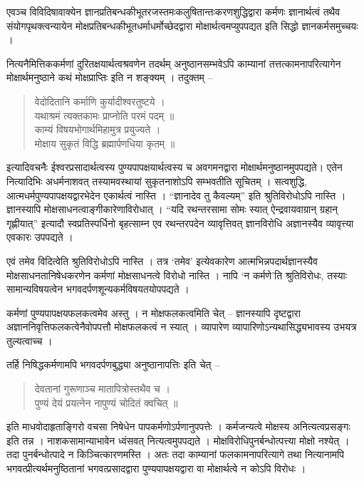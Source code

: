 एवञ्च विविदिषावाक्येन ज्ञानप्रतिबन्धकीभूतरजस्तमःकलुषितान्तःकरणशुद्धिद्वारा कर्मणः ज्ञानार्थत्वं तथैव संयोगपृथक्त्वन्यायेन मोक्षप्रतिबन्धकीभूतधर्माधर्मोच्छेदद्वारा मोक्षार्थत्वमप्युपपद्यत इति सिद्धो ज्ञानकर्मसमुच्चयः ।

नित्यनैमित्तिककर्मणां दुरितक्षयार्थत्वश्रवणेन तदर्थम् अनुष्ठानसम्भवेऽपि काम्यानां तत्तत्कामनापरित्यागेन मोक्षार्थमनुष्ठाने कथं मोक्षप्राप्तिः इति न शङ्क्यम् । तदुक्तम् –
\begin{verse}
वेदोदितानि कर्माणि कुर्यादीश्वरतुष्टये ।\\
यथाश्रमं त्यक्तकामः प्राप्नोति परमं पदम् ॥\\
काम्यं विषयभोगार्थमिहामुत्र प्रयुज्यते ।\\
मोक्षाय सुकृतं विद्धि ब्रह्मार्पणधिया कृतम् ॥
\end{verse}
इत्यादिवचनैः ईश्वरप्रसादार्थत्वस्य पुण्यपापक्षयार्थत्वस्य च अवगमनद्वारा मोक्षार्थमनुष्ठानमुपपद्यते। एतेन नित्यादिभिः अधर्मनाशवत् तस्यामवस्थायां सुकृतनाशोऽपि सम्भवतीति सूचितम् । सत्वशुद्धि, आत्मधर्मपुण्यपापक्षयद्वारभेदेन एकार्थत्वं नास्ति । “ज्ञानादेव तु कैवल्यम्” इति श्रुतिविरोधोऽपि नास्ति । ज्ञानस्यापि मोक्षसाधनत्वाङ्गीकारेणाविरोधात् । “यदि रथन्तरसामा सोमः स्यात् ऐन्द्रवायवाग्रान् ग्रहान् गृह्णीयात्” इत्यादौ स्वप्रतिस्पर्धिनो बृहत्साम्न एव रथन्तरपदेन व्यावृत्तिवत् ज्ञानविरोधि अज्ञानस्यैव व्यावृत्त्या एवकारः उपपद्यते ।

एवं तमेव विदित्वेति श्रुतिविरोधोऽपि नास्ति । तत्र ‘तमेव’ इत्येवकारेण आत्मभिन्नपदार्थज्ञानस्यैव मोक्षसाधनतानिषेधकरणेन कर्मणां मोक्षसाधनत्वे विरोधो नास्ति । नापि ‘न कर्मणे’ति श्रुतिविरोधः, तस्याः सामान्यविषयत्वेन भगवदर्पणशून्यकर्मविषयतयोपपद्यते ।

कर्मणां पुण्यपापक्षयफलकत्वमेव अस्तु । न मोक्षफलकत्वमिति चेत् – ज्ञानस्यापि दृष्टद्वारा अज्ञाननिवृत्तिफलकत्वेनैवोपपत्तौ मोक्षफलकत्वं न स्यात् । व्यापारेण व्यापारिणोऽन्यथासिद्ध्यभावस्य उभयत्र तुल्यत्वाच्च ।

तर्हि निषिद्धकर्मणामपि भगवदर्पणबुद्ध्या अनुष्ठानापत्तिः इति चेत् –
\begin{verse}
देवतानां गुरूणाञ्च मातापित्रोस्तथैव च ।\\
पुण्यं देयं प्रयत्नेन नापुण्यं चोदितं क्वचित् ॥
\end{verse}
इति माधवोदाहृताङ्गिरो वचसा निषेधेन पापकर्मणोऽर्पणानुपपत्तेः । कर्मजन्यत्वे मोक्षस्य अनित्यत्वप्रसङ्गः इति तन्न । नाशकसामान्याभावेन ध्वंसवत् नित्यत्वमुपपद्यते । मोक्षविरोधिपुनर्बन्धोत्पत्त्या मोक्षो नश्येत् । तदा पुनर्बन्धोत्पादे न किञ्चित्कारणमस्ति । अतः तदा काम्यानां फलकामनापरित्यागे तथा नित्यानामपि भगवत्प्रीत्यर्थमनुष्ठितानां भगवत्प्रसादद्वारा पुण्यपापक्षयद्वारा वा मोक्षार्थत्वे न कोऽपि विरोधः ।

